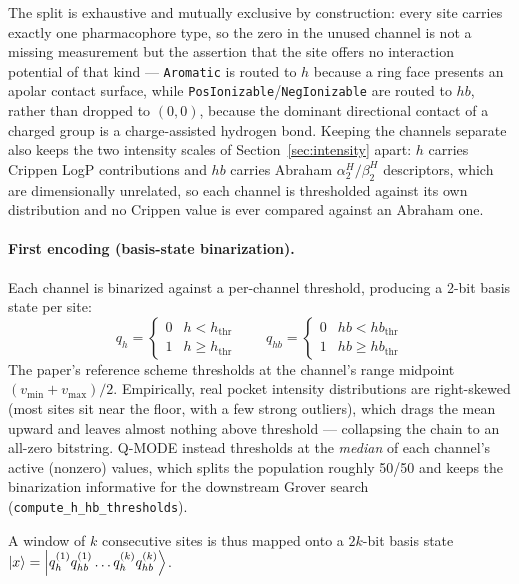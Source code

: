 \documentclass[11pt,a4paper]{article}
\begin{document}
The split is exhaustive and mutually exclusive by construction: every site carries exactly one pharmacophore type, so the zero in the unused channel is not a missing measurement but the assertion that the site offers no interaction potential of that kind --- \texttt{Aromatic} is routed to $h$ because a ring face presents an apolar contact surface, while \texttt{PosIonizable}/\texttt{NegIonizable} are routed to $hb$, rather than dropped to $(0,0)$, because the dominant directional contact of a charged group is a charge-assisted hydrogen bond.
Keeping the channels separate also keeps the two intensity scales of Section~\ref{sec:intensity} apart: $h$ carries Crippen LogP contributions and $hb$ carries Abraham $\alpha_2^H/\beta_2^H$ descriptors, which are dimensionally unrelated, so each channel is thresholded against its own distribution and no Crippen value is ever compared against an Abraham one.

\paragraph{First encoding (basis-state binarization).} Each channel is binarized against a per-channel threshold, producing a 2-bit basis state per site:
\[
q_h = \begin{cases} 0 & h < h_{\text{thr}} \\ 1 & h \ge h_{\text{thr}} \end{cases}
\qquad
q_{hb} = \begin{cases} 0 & hb < hb_{\text{thr}} \\ 1 & hb \ge hb_{\text{thr}} \end{cases}
\]
The paper's reference scheme thresholds at the channel's range midpoint $(v_{\min}+v_{\max})/2$. Empirically, real pocket intensity distributions are right-skewed (most sites sit near the floor, with a few strong outliers), which drags the mean upward and leaves almost nothing above threshold — collapsing the chain to an all-zero bitstring. Q-MODE instead thresholds at the \emph{median} of each channel's active (nonzero) values, which splits the population roughly 50/50 and keeps the binarization informative for the downstream Grover search (\texttt{compute\_h\_hb\_thresholds}).

A window of $k$ consecutive sites is thus mapped onto a $2k$-bit basis state $\ket{x} = \ket{q_h^{(1)} q_{hb}^{(1)} \ldots q_h^{(k)} q_{hb}^{(k)}}$.
\end{document}
